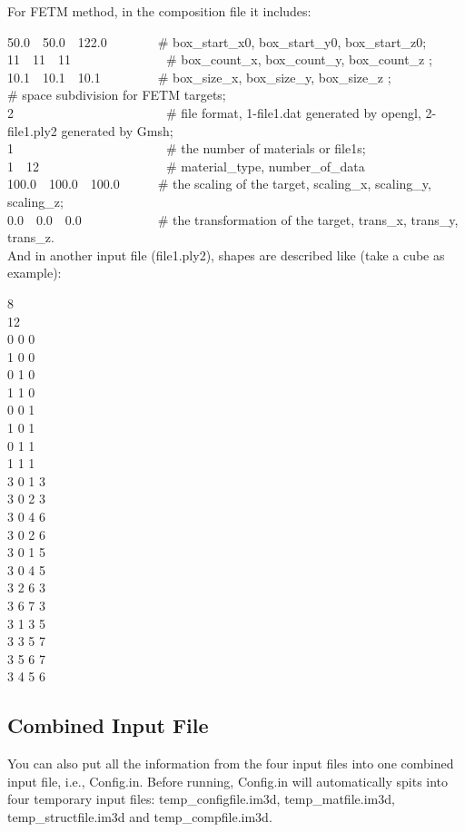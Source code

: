 For FETM method, in the composition file it includes:

50.0~~50.0~~122.0~~~~~~~~\# box\_start\_x0, box\_start\_y0, box\_start\_z0;\\
11~~11~~11~~~~~~~~~~~~~~~\# box\_count\_x,  box\_count\_y,  box\_count\_z ;\\
10.1~~10.1~~10.1~~~~~~~~~\# box\_size\_x,   box\_size\_y,   box\_size\_z  ;\\
\# space subdivision for FETM targets;\\
2~~~~~~~~~~~~~~~~~~~~~~~~\# file format, 1-file1.dat generated by opengl, 2-file1.ply2 generated by Gmsh;\\
1~~~~~~~~~~~~~~~~~~~~~~~~\# the number of materials or file1s;\\
1~~12~~~~~~~~~~~~~~~~~~~~\# material\_type, number\_of\_data\\
100.0~~100.0~~100.0~~~~~~\# the scaling of the target, scaling\_x, scaling\_y, scaling\_z;\\
0.0~~0.0~~0.0~~~~~~~~~~~~\# the transformation of the target, trans\_x, trans\_y, trans\_z.\\

And in another input file (file1.ply2), shapes are described like (take a cube as example):

8\\
12\\
0 0 0\\
1 0 0\\
0 1 0\\
1 1 0\\
0 0 1\\
1 0 1\\
0 1 1\\
1 1 1\\
3 0 1 3\\
3 0 2 3\\
3 0 4 6\\
3 0 2 6\\
3 0 1 5\\
3 0 4 5\\
3 2 6 3\\
3 6 7 3\\
3 1 3 5\\
3 3 5 7\\
3 5 6 7\\
3 4 5 6\\

\subsection{Combined Input File}

You can also put all the information from the four input files into one combined input file, i.e., Config.in. Before running, Config.in will automatically spits into four temporary input files: temp\_configfile.im3d, temp\_matfile.im3d, temp\_structfile.im3d and temp\_compfile.im3d.
